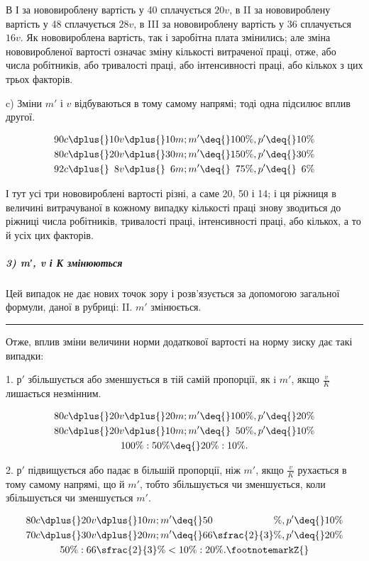 
В І за нововироблену вартість у 40 сплачується $20 v$, в II
за нововироблену вартість у 48 сплачується $28 v$, в III за нововироблену
вартість у 36 сплачується $16 v$. Як нововироблена
вартість, так і заробітна плата змінились; але зміна нововиробленої
вартості означає зміну кількості витраченої праці, отже,
або числа робітників, або тривалості праці, або інтенсивності
праці, або кількох з цих трьох факторів.

c) Зміни $m'$ і $v$ відбуваються в тому самому напрямі; тоді
одна підсилює вплив другої.

\begin{gather*}
90 c \dplus{} 10 v \dplus{} 10 m; m' \deq{} 100\%, p' \deq{} 10\% \\
80 c \dplus{} 20 v \dplus{} 30 m; m' \deq{} 150\%, p' \deq{} 30\% \\
92 c \dplus{} \phantom{0}8 v \dplus{} \phantom{0}6 m; m' \deq{} \phantom{1}75\%, p' \deq{} \phantom{1}6\%
\end{gather*}

\noindent{}І тут усі три нововироблені вартості різні, а саме 20, 50 і 14;
і ця ріжниця в величині витрачуваної в кожному випадку кількості
праці знову зводиться до ріжниці числа робітників, тривалості
праці, інтенсивності праці, або кількох, а то й усіх цих факторів.



\subparagraph*{3) m′, v і К змінюються}
Цей випадок не дає нових точок зору і розв’язується за допомогою
загальної формули, даної в рубриці: II. $m'$ змінюється.

\pfbreak{}

Отже, вплив зміни величини норми додаткової вартості на
норму зиску дає такі випадки:

1. $р'$ збільшується або зменшується в тій самій пропорції, як
i $m'$, якщо $\frac{v}{K}$  лишається незмінним.

\begin{gather*}
80 c \dplus{} 20 v \dplus{} 20 m; m' \deq{} 100\%, p' \deq{} 20\% \\
80 c \dplus{} 20 v \dplus{} 10 m; m' \deq{} \phantom{1}50\%, p' \deq{} 10\% \\
100\% : 50\% \deq{} 20\% : 10\%.
\end{gather*}

2. $р'$ підвищується або падає в більшій пропорції, ніж $m'$,
якщо $\frac{v}{K}$ рухається в тому самому напрямі, що й $m'$, тобто
збільшується чи зменшується, коли збільшується чи зменшується
$m'$.

\begin{gather*}
80 c \dplus{} 20 v \dplus{} 10 m; m' \deq{} 50\phantom{\sfrac{2}{3}}\%, p' \deq{} 10\% \\
70 c \dplus{} 30 v \dplus{} 20 m; m' \deq{} 66\sfrac{2}{3}\%, p' \deq{} 20\% \\
50\% : 66\sfrac{2}{3}\% < 10\% : 20\%.\text{\footnotemarkZ{}}
\end{gather*}


